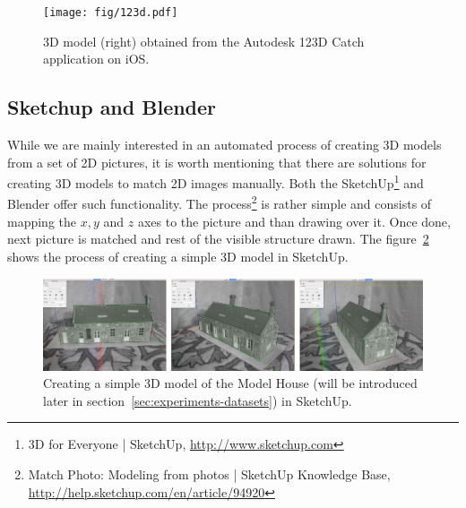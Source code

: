\begin{figure}[ht]
	\begin{center}
		\texttt{[image: fig/123d.pdf]}
	\end{center}
	\caption{3D model (right) obtained from the Autodesk 123D Catch application on iOS.}
	\label{fig:openvmg}
\end{figure}

\subsection*{Sketchup and Blender}
While we are mainly interested in an automated process of creating 3D models from a set of 2D pictures, it is worth mentioning that there are solutions for creating 3D models to match 2D images manually. Both the SketchUp\footnote{3D for Everyone | SketchUp, \url{http://www.sketchup.com}} and Blender offer such functionality. The process\footnote{Match Photo: Modeling from photos | SketchUp Knowledge Base, \url{http://help.sketchup.com/en/article/94920}} is rather simple and consists of mapping the $x, y$ and $z$ axes to the picture and than drawing over it. Once done, next picture is matched and rest of the visible structure drawn. The figure~\ref{fig:sketchup} shows the process of creating a simple 3D model in SketchUp.

\begin{figure}[ht]
	\begin{center}
		\includegraphics[keepaspectratio,width=\textwidth]{fig/sketchup_modelhouse.pdf}
	\end{center}
	\caption{Creating a simple 3D model of the Model House (will be introduced later in section~\ref{sec:experiments-datasets}) in SketchUp.}
	\label{fig:sketchup}
\end{figure}

